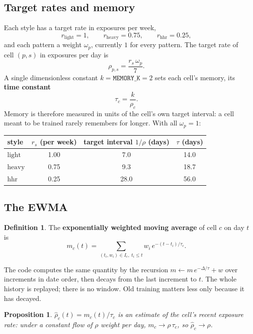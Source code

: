 \documentclass[11pt]{article}
\theoremstyle{plain}
\newtheorem{proposition}{Proposition}
\theoremstyle{definition}
\newtheorem{definition}{Definition}
\newcommand{\code}[1]{\texttt{#1}}
\newcommand{\light}{\mathrm{light}}
\newcommand{\heavy}{\mathrm{heavy}}
\newcommand{\hhr}{\mathrm{hhr}}
\begin{document}
\subsection{Target rates and memory}

Each style has a target rate in exposures per week,
\[
r_\light = 1, \qquad r_\heavy = 0.75, \qquad r_\hhr = 0.25,
\]
and each pattern a weight $\omega_p$, currently $1$ for every pattern.
The target rate of cell $(p, s)$ in exposures per day is
\[
\rho_{p,s} = \frac{r_s\, \omega_p}{7}.
\]
A single dimensionless constant $k = \code{MEMORY\_K} = 2$ sets each
cell's memory, its \textbf{time constant}
\[
\tau_c = \frac{k}{\rho_c}.
\]
Memory is therefore measured in units of the cell's own target interval:
a cell meant to be trained rarely remembers for longer. With all
$\omega_p = 1$:

\begin{center}
\begin{tabular}{lccc}
\toprule
style & $r_s$ (per week) & target interval $1/\rho$ (days) & $\tau$ (days) \\
\midrule
$\light$ & 1.00 & 7.0  & 14.0 \\
$\heavy$ & 0.75 & 9.3  & 18.7 \\
$\hhr$   & 0.25 & 28.0 & 56.0 \\
\bottomrule
\end{tabular}
\end{center}

\subsection{The EWMA}

\begin{definition}
The \textbf{exponentially weighted moving average} of cell $c$ on day $t$
is
\[
m_c(t) = \sum_{(t_i, w_i) \in I_c,\; t_i \le t} w_i\, e^{-(t - t_i)/\tau_c}.
\]
\end{definition}

The code computes the same quantity by the recursion
$m \leftarrow m\, e^{-\Delta/\tau} + w$ over increments in date order,
then decays from the last increment to $t$. The whole history is
replayed; there is no window. Old training matters less only because it
has decayed.

\begin{proposition}\label{prop:rate}
$\hat\rho_c(t) = m_c(t)/\tau_c$ is an estimate of the cell's recent
exposure rate: under a constant flow of $\rho$ weight per day,
$m_c \to \rho\, \tau_c$, so $\hat\rho_c \to \rho$.
\end{proposition}
\end{document}
